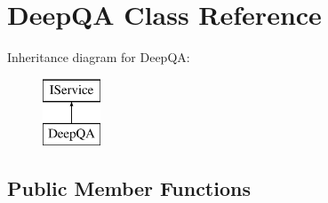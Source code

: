 \hypertarget{class_deep_q_a}{}\section{Deep\+QA Class Reference}
\label{class_deep_q_a}
Inheritance diagram for Deep\+QA\+:\begin{figure}[H]
\begin{center}
\leavevmode
\includegraphics[height=2.000000cm]{class_deep_q_a}
\end{center}
\end{figure}
\subsection*{Public Member Functions}
